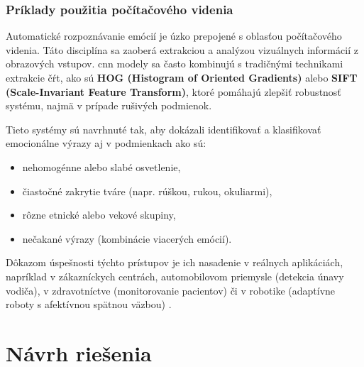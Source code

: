 \subsubsection{Príklady použitia počítačového videnia}

Automatické rozpoznávanie emócií je úzko prepojené s oblasťou počítačového videnia. Táto disciplína sa zaoberá extrakciou a analýzou vizuálnych informácií z obrazových vstupov. \gls{cnn} modely sa často kombinujú s tradičnými technikami extrakcie čŕt, ako sú \textbf{HOG (Histogram of Oriented Gradients)} alebo \textbf{SIFT (Scale-Invariant Feature Transform)}, ktoré pomáhajú zlepšiť robustnosť systému, najmä v prípade rušivých podmienok.

Tieto systémy sú navrhnuté tak, aby dokázali identifikovať a klasifikovať emocionálne výrazy aj v podmienkach ako sú:

\begin{itemize}
    \item nehomogénne alebo slabé osvetlenie,
    \item čiastočné zakrytie tváre (napr. rúškou, rukou, okuliarmi),
    \item rôzne etnické alebo vekové skupiny,
    \item nečakané výrazy (kombinácie viacerých emócií).
\end{itemize}

Dôkazom úspešnosti týchto prístupov je ich nasadenie v reálnych aplikáciách, napríklad v zákazníckych centrách, automobilovom priemysle (detekcia únavy vodiča), v zdravotníctve (monitorovanie pacientov) či v robotike (adaptívne roboty s afektívnou spätnou väzbou) \cite{Huang2023}.


\section{Návrh riešenia}        %
